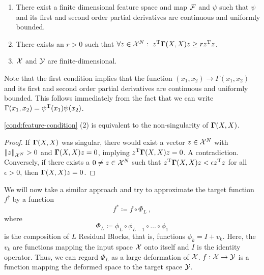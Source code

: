 \begin{condition}
	\label{cond:feature-condition}\mbox{}
	\vspace*{-\parsep}
	\vspace*{-\baselineskip}
	\begin{enumerate}
		\item There exist a finite dimensional feature space and map $\mathcal{F}$ and $\psi$ such that $\psi$ and its first and second order partial derivatives are continuous and uniformly bounded.
		\item There exists an $r > 0$ such that $\forall z \in \mathcal{X}^N:~z^{\mathrm{T}} \mathbf{\Gamma}(X, X) z \geq r z^{\mathrm{T}} z$.
		\item $\mathcal{X}$ and $\mathcal{Y}$ are finite-dimensional.
	\end{enumerate}
\end{condition}
Note that the first condition implies that the function $(x_1, x_2) \rightarrow \Gamma(x_1, x_2)$ and its first and second order partial derivatives are continuous and uniformly bounded.
This follows immediately from the fact that we can write $\Gamma(x_1, x_2) = \psi^{\mathrm{T}}(x_1)\psi(x_2)$.
\begin{lemma}
	\cref{cond:feature-condition} (2) is equivalent to the non-singularity of $\mathbf{\Gamma}(X, X)$.
\end{lemma}
\begin{proof}
	If $\mathbf{\Gamma}(X, X)$ was singular, there would exist a vector $z \in \mathcal{X}^N$ with $\norm{z}_{\mathcal{X}^N} > 0$ and $\mathbf{\Gamma}(X, X) z = 0$, implying $z^{\mathrm{T}} \mathbf{\Gamma}(X, X)z = 0$. 
	A contradiction.
	Conversely, if there exists a $0 \neq z \in \mathcal{X}^N$ such that $z^{\mathrm{T}} \mathbf{\Gamma}(X, X) z < \epsilon z^{\mathrm{T}} z$ for all $\epsilon > 0$, then $\mathbf{\Gamma}(X, X) z = 0$.
\end{proof}



We will now take a similar approach and try to approximate the target function $f^\dagger$ by a function
\begin{equation}
	f^\ast \coloneqq f \circ \Phi_L \ ,
\end{equation}
where 
\begin{equation}
	\Phi_L \coloneqq \phi_L \circ \phi_{L-1} \circ \ldots \circ \phi_1
\end{equation} 
is the composition of $L$ Residual Blocks, that is, functions $\phi_k = I + v_k$.
Here, the $v_k$ are functions mapping the input space $\mathcal{X}$ onto itself and $I$ is the identity operator.
Thus, we can regard $\Phi_L$ as a large deformation of $\mathcal{X}$.
$f: \mathcal{X} \to \mathcal{Y}$ is a function mapping the deformed space to the target space $\mathcal{Y}$.

